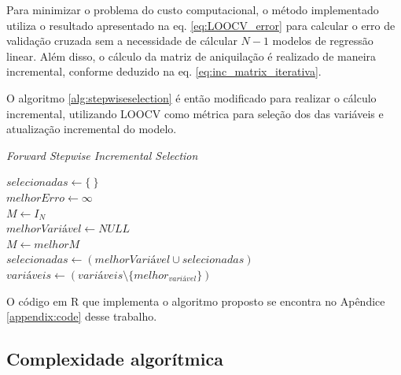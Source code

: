 Para minimizar o problema do custo computacional, o método implementado utiliza o resultado apresentado na eq. \ref{eq:LOOCV_error} para calcular o erro de validação cruzada sem a necessidade de cálcular $N-1$ modelos de regressão linear. Além disso, o cálculo da matriz de aniquilação é realizado de maneira incremental, conforme deduzido na eq. \ref{eq:inc_matrix_iterativa}.

O algoritmo \ref{alg:stepwiseselection} é então modificado para realizar o cálculo incremental, utilizando LOOCV como métrica para seleção dos das variáveis e atualização incremental do modelo.

\qquad

\begin{algorithm}[H]
    \caption{\textit{Forward Stepwise Incremental Selection}}
    
    $selecionadas \gets \{\ \}$ \\
    $melhorErro \gets \infty$ \\
    $M \gets I_N$ \\

    { 
        $melhorVariável \gets NULL$ \\
        $M \gets melhorM $ \\
        $selecionadas \gets (melhorVariável \cup selecionadas)$ \\
        $variáveis \gets (variáveis \setminus \{melhor_{variável}\})$ \\
    }
    \label{alg:incstepwiseselection}
\end{algorithm}

O código em R que implementa o algoritmo proposto se encontra no Apêndice \ref{appendix:code} desse trabalho.

\subsection{Complexidade algorítmica}

